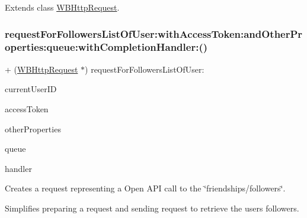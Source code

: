 Extends class \mbox{\hyperlink{interface_w_b_http_request_a0437dae63fa8fe40c7c5b323b45e0094}{W\+B\+Http\+Request}}.

\mbox{\label{category_w_b_http_request_07_weibo_user_08_a0437dae63fa8fe40c7c5b323b45e0094}} 
\subsubsection{\texorpdfstring{request\+For\+Followers\+List\+Of\+User\+:with\+Access\+Token\+:and\+Other\+Properties\+:queue\+:with\+Completion\+Handler\+:()}{requestForFollowersListOfUser:withAccessToken:andOtherProperties:queue:withCompletionHandler:()}\hspace{0.1cm}{\footnotesize\ttfamily [3/3]}}
{\footnotesize\ttfamily + (\mbox{\hyperlink{interface_w_b_http_request}{W\+B\+Http\+Request}} $\ast$) request\+For\+Followers\+List\+Of\+User\+: \begin{DoxyParamCaption}\item[{(N\+S\+String $\ast$)}]{current\+User\+ID }\item[{withAccessToken:(N\+S\+String $\ast$)}]{access\+Token }\item[{andOtherProperties:(N\+S\+Dictionary $\ast$)}]{other\+Properties }\item[{queue:(N\+S\+Operation\+Queue $\ast$)}]{queue }\item[{withCompletionHandler:(W\+B\+Request\+Handler)}]{handler }\end{DoxyParamCaption}}

Creates a request representing a Open A\+PI call to the \char`\"{}friendships/followers\char`\"{}.

Simplifies preparing a request and sending request to retrieve the user\textquotesingle{}s followers.

